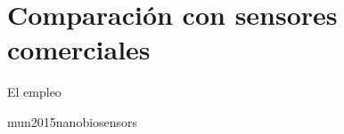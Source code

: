 \chapter{Comparación con sensores comerciales}
\label{chapter:Comparacion}

El empleo 

mun2015nanobiosensors

